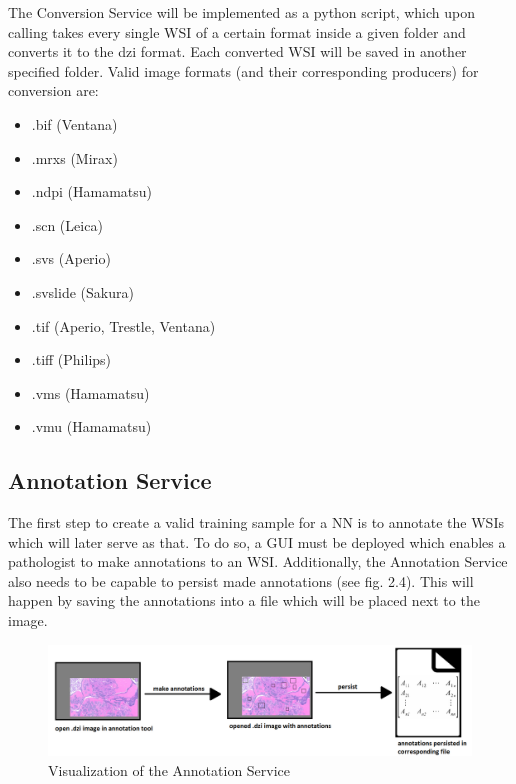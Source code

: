 The Conversion Service will be implemented as a python script, which upon calling takes every single WSI of a certain format inside a given folder and converts it to the dzi format. Each converted WSI will be saved in another specified folder. Valid image formats (and their corresponding producers) for conversion are:

\begin{itemize}
	\item .bif (Ventana)
	\item .mrxs (Mirax)
	\item .ndpi (Hamamatsu)
	\item .scn (Leica)
	\item .svs (Aperio)
	\item .svslide (Sakura)
	\item .tif (Aperio, Trestle, Ventana)
	\item .tiff (Philips)
	\item .vms (Hamamatsu)
	\item .vmu (Hamamatsu)
\end{itemize}


\subsection{Annotation Service}

The first step to create a valid training sample for a NN is to annotate the WSIs which will later serve as that. To do so, a GUI must be deployed which enables a pathologist to make annotations to an WSI. Additionally, the Annotation Service also needs to be capable to persist made annotations (see fig. 2.4). This will happen by saving the annotations into a file which will be placed next to the image.

\begin{figure}[H]
	\begin{center}
		\includegraphics[scale=0.25]{img/processChainB.png}
		\caption{Visualization of the Annotation Service}
		\label{fig:fig2.4}
	\end{center}
\end{figure}

